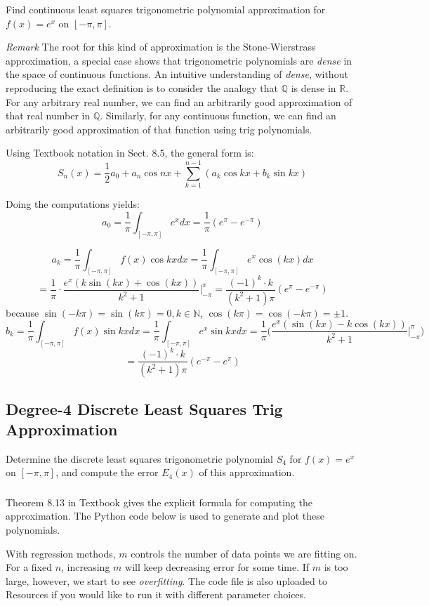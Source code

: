 \documentclass[12pt]{article} %
\newcommand{\rr}{\mathbb{R}}
\newcommand{\nn}{\mathbb{N}}
\newcommand{\1}[1]{\mathds{1}\left[#1\right]}
\begin{document}
Find continuous least squares trigonometric polynomial approximation for $f(x) = e^x$ on $[-\pi,\pi]$. 

\emph{Remark}
The root for this kind of approximation is the {\color{black} Stone-Wierstrass approximation}, a special case shows that trigonometric polynomials are \emph{dense} in the space of continuous functions. An intuitive understanding of \emph{dense}, without reproducing the exact definition is to consider the analogy that $\mathbb{Q}$ is dense in $\rr$. For any arbitrary real number, we can find an arbitrarily good approximation of that real number in $\mathbb{Q}$. Similarly, for any continuous function, we can find an arbitrarily good approximation of that function using trig polynomials. 

Using Textbook notation in Sect. 8.5, the general form is:
$$
	S_n(x) = \frac12a_0 + a_n\cos nx + \sum_{k=1}^{n-1}(a_k\cos kx + b_k\sin kx)
$$

Doing the computations yields:
$$
	a_0 = \frac{1}{\pi}\int_{[-\pi,\pi]}e^xdx = \frac{1}{\pi}(e^{\pi} - e^{-\pi})
$$

$$
	a_k = \frac{1}{\pi}\int_{[-\pi,\pi]}f(x)\cos kxdx = \frac{1}{\pi}\int_{[-\pi,\pi]}e^x\cos(kx)dx
$$
$$
	= \frac{1}{\pi}\cdot\frac{e^x(k\sin(kx) + \cos(kx))}{k^2+1}\big|_{-\pi}^{\pi} = \frac{(-1)^k\cdot k }{(k^2+1)\pi}(e^{\pi}-e^{-\pi})
$$ because $\sin(-k\pi) = \sin(k\pi) = 0, k \in \nn$, $\cos(k\pi)=\cos(-k\pi) = \pm 1$.
$$
	b_k =\frac{1}{\pi} \int_{[-\pi,\pi]}f(x)\sin kxdx = \frac{1}{\pi} \int_{[-\pi,\pi]}e^x\sin kxdx=\frac{1}{\pi}\bigg(
	\frac{e^x(\sin(kx) - k\cos(kx))}{k^2+1}\big|_{-\pi}^{\pi}
	\bigg)
$$
$$
	= \frac{(-1)^k\cdot k }{(k^2+1)\pi}(e^{-\pi}-e^{\pi})
$$


\subsection{Degree-4 Discrete Least Squares Trig Approximation}
Determine the discrete least squares trigonometric polynomial $S_4$ for $f(x) = e^x$ on $[-\pi,\pi]$, and compute the error $E_4(x)$ of this approximation.
\subsubsection{}
Theorem 8.13 in Textbook gives the explicit formula for computing the approximation. The Python code below is used to generate and plot these polynomials. 

With regression methods, $m$ controls the number of data points we are fitting on. For a fixed $n$, increasing $m$ will keep decreasing error for some time. If $m$ is too large, however, we start to see \emph{overfitting}. The code file is also uploaded to Resources if you would like to run it with different parameter choices.
\end{document}
